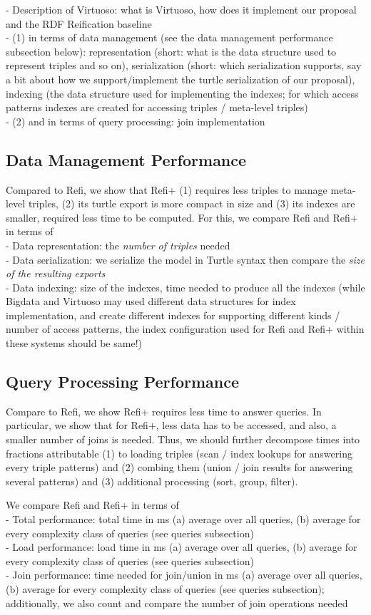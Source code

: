 - Description of Virtuoso: what is Virtuoso, how does it implement our proposal and the RDF Reification baseline\\
- (1) in terms of data management (see the data management performance subsection below): representation (short: what is the data structure used to represent triples and so on), serialization (short: which serialization supports, say a bit about how we support/implement the turtle serialization of our proposal), indexing (the data structure used for implementing the indexes; for which access patterns indexes are created for accessing triples /  meta-level triples)\\
- (2) and in terms of query processing: join implementation\\


\subsection{Data Management Performance}
Compared to Refi, we show that Refi+ (1) requires less triples to manage meta-level triples, (2) its turtle export is more compact in size and (3) its indexes are smaller, required less time to be computed. For this, we compare Refi and Refi+ in terms of \\ 
- Data representation: the \emph{number of triples} needed\\
- Data serialization: we serialize the model in Turtle syntax then compare the \emph{size of the resulting exports}\\
- Data indexing: size of the indexes, time needed to produce all the indexes (while Bigdata and Virtuoso may used different data structures for index implementation, and create different indexes for supporting different kinds / number of access patterns, the index configuration used for Refi and Refi+ within these systems should be same!)


\subsection{Query Processing Performance}
Compare to Refi, we show Refi+ requires less time to answer queries. In particular, we show that for Refi+, less data has to be accessed, and also, a smaller number of joins is needed. Thus, we should further decompose times into fractions attributable (1) to loading triples (scan / index lookups for answering every triple patterns) and (2) combing them  (union / join results for answering several patterns) and (3) additional processing (sort, group, filter). 

We compare Refi and Refi+ in terms of \\ 
- Total performance: total time in ms (a) average over all queries, (b) average for every complexity class of queries (see queries subsection)\\
- Load performance: load time in ms (a) average over all queries, (b) average for every complexity class of queries (see queries subsection)\\ 
- Join performance: time needed for join/union in ms (a) average over all queries, (b) average for every complexity class of queries (see queries subsection); additionally, we also count and compare the number of join operations needed 


